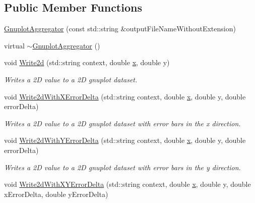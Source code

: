 \subsection*{Public Member Functions}
\begin{DoxyCompactItemize}
\item 
\hyperlink{classns3_1_1GnuplotAggregator_a03bf6e646260ba955ac579814bc7f29e}{Gnuplot\+Aggregator} (const std\+::string \&output\+File\+Name\+Without\+Extension)
\item 
virtual \hyperlink{classns3_1_1GnuplotAggregator_a6af27c8634b6cd55da119f95a5435dd7}{$\sim$\+Gnuplot\+Aggregator} ()
\item 
void \hyperlink{classns3_1_1GnuplotAggregator_a18d1be357d703299d71519f08c4fda07}{Write2d} (std\+::string context, double \hyperlink{lte__link__budget__x2__handover__measures_8m_a9336ebf25087d91c818ee6e9ec29f8c1}{x}, double y)
\begin{DoxyCompactList}\small\item\em Writes a 2D value to a 2D gnuplot dataset. \end{DoxyCompactList}\item 
void \hyperlink{classns3_1_1GnuplotAggregator_a0c47d76ef86bb71b67a43580b0531c01}{Write2d\+With\+X\+Error\+Delta} (std\+::string context, double \hyperlink{lte__link__budget__x2__handover__measures_8m_a9336ebf25087d91c818ee6e9ec29f8c1}{x}, double y, double error\+Delta)
\begin{DoxyCompactList}\small\item\em Writes a 2D value to a 2D gnuplot dataset with error bars in the x direction. \end{DoxyCompactList}\item 
void \hyperlink{classns3_1_1GnuplotAggregator_a36b09cdf943f3ee6e367ab64ccf63b65}{Write2d\+With\+Y\+Error\+Delta} (std\+::string context, double \hyperlink{lte__link__budget__x2__handover__measures_8m_a9336ebf25087d91c818ee6e9ec29f8c1}{x}, double y, double error\+Delta)
\begin{DoxyCompactList}\small\item\em Writes a 2D value to a 2D gnuplot dataset with error bars in the y direction. \end{DoxyCompactList}\item 
void \hyperlink{classns3_1_1GnuplotAggregator_a7cfd1bee4448141457246c9eb8b2a2b6}{Write2d\+With\+X\+Y\+Error\+Delta} (std\+::string context, double \hyperlink{lte__link__budget__x2__handover__measures_8m_a9336ebf25087d91c818ee6e9ec29f8c1}{x}, double y, double x\+Error\+Delta, double y\+Error\+Delta)

\end{DoxyCompactItemize}
